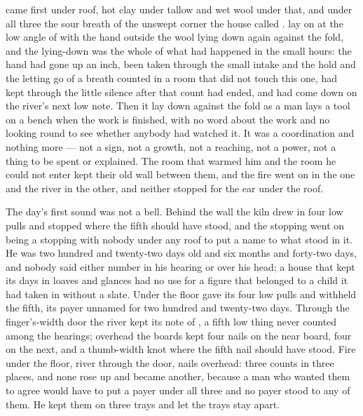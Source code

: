 
 came first under  roof, hot clay under tallow and wet wool under that, and under all three the sour  breath of the unswept corner the house called .  lay on  at the low angle of  with the hand outside the wool lying down again against the fold, and the lying-down was the whole of what had happened in the small hours: the hand had gone up an inch, been taken through the small intake and the hold and the letting go of a breath counted in a room that did not touch this one, had kept through the little silence after that count had ended, and had come down on the river's next low note. Then it lay down against the fold as a man lays a tool on a bench when the work is finished, with no word about the work and no looking round to see whether anybody had watched it. It was a coordination and nothing more --- not a sign, not a growth, not a reaching, not a power, not a thing to be spent or explained. The room that warmed him and the room he could not enter kept their old wall between them, and the fire went on in the one and the river in the other, and neither stopped for the ear under the roof.

The day's first sound was not a bell. Behind the wall the kiln drew in four low pulls and stopped where the fifth should have stood, and the stopping went on being a stopping with nobody under any roof to put a name to what stood in it. He was two hundred and twenty-two days old and six months and forty-two days, and nobody said either number in his hearing or over his head; a house that kept its days in loaves and glances had no use for a figure that belonged to a child it had taken in without a slate. Under the floor  gave its four low pulls and withheld the fifth, its payer unnamed for two hundred and twenty-two days. Through the finger's-width door the river kept its note of , a fifth low thing never counted among the hearings; overhead the boards kept four nails on the near board, four on the next, and a thumb-width knot where the fifth nail should have stood. Fire under the floor, river through the door, nails overhead: three counts in three places, and none rose up and became another, because a man who wanted them to agree would have to put a payer under all three and no payer stood to any of them. He kept them on three trays and let the trays stay apart.

